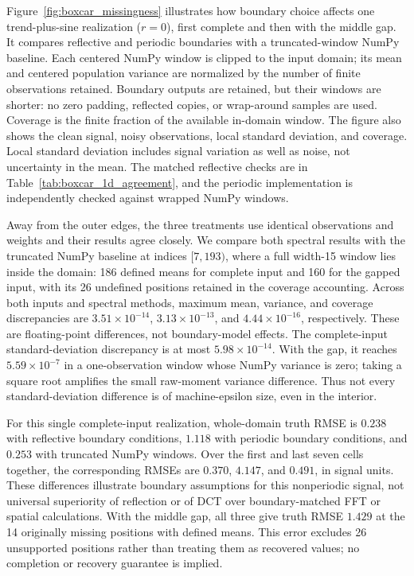 \documentclass[a4paper,fleqn]{cas-sc}
\begin{document}
Figure~\ref{fig:boxcar_missingness} illustrates how boundary choice affects one trend-plus-sine realization ($r=0$), first complete and then with the middle gap. It compares reflective and periodic boundaries with a truncated-window NumPy baseline. Each centered NumPy window is clipped to the input domain; its mean and centered population variance are normalized by the number of finite observations retained. Boundary outputs are retained, but their windows are shorter: no zero padding, reflected copies, or wrap-around samples are used. Coverage is the finite fraction of the available in-domain window. The figure also shows the clean signal, noisy observations, local standard deviation, and coverage. Local standard deviation includes signal variation as well as noise, not uncertainty in the mean. The matched reflective checks are in Table~\ref{tab:boxcar_1d_agreement}, and the periodic implementation is independently checked against wrapped NumPy windows.

Away from the outer edges, the three treatments use identical observations and weights and their results agree closely. We compare both spectral results with the truncated NumPy baseline at indices $[7,193)$, where a full width-15 window lies inside the domain: 186 defined means for complete input and 160 for the gapped input, with its 26 undefined positions retained in the coverage accounting. Across both inputs and spectral methods, maximum mean, variance, and coverage discrepancies are $3.51\times10^{-14}$, $3.13\times10^{-13}$, and $4.44\times10^{-16}$, respectively. These are floating-point differences, not boundary-model effects. The complete-input standard-deviation discrepancy is at most $5.98\times10^{-14}$. With the gap, it reaches $5.59\times10^{-7}$ in a one-observation window whose NumPy variance is zero; taking a square root amplifies the small raw-moment variance difference. Thus not every standard-deviation difference is of machine-epsilon size, even in the interior.

For this single complete-input realization, whole-domain truth RMSE is $0.238$ with reflective boundary conditions, $1.118$ with periodic boundary conditions, and $0.253$ with truncated NumPy windows. Over the first and last seven cells together, the corresponding RMSEs are $0.370$, $4.147$, and $0.491$, in signal units. These differences illustrate boundary assumptions for this nonperiodic signal, not universal superiority of reflection or of DCT over boundary-matched FFT or spatial calculations. With the middle gap, all three give truth RMSE $1.429$ at the 14 originally missing positions with defined means. This error excludes 26 unsupported positions rather than treating them as recovered values; no completion or recovery guarantee is implied.
\end{document}
